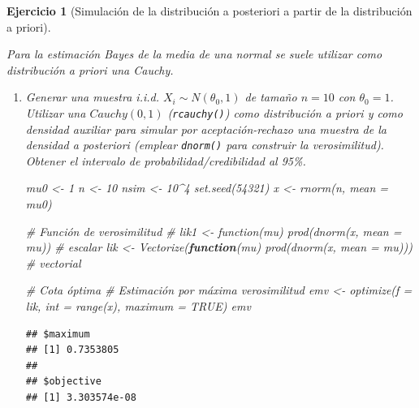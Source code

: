 \documentclass[
]{book}
\newenvironment{Shaded}{\begin{snugshade}}{\end{snugshade}}
\newcommand{\AttributeTok}[1]{\textcolor[rgb]{0.77,0.63,0.00}{#1}}
\newcommand{\CommentTok}[1]{\textcolor[rgb]{0.56,0.35,0.01}{\textit{#1}}}
\newcommand{\ConstantTok}[1]{\textcolor[rgb]{0.00,0.00,0.00}{#1}}
\newcommand{\ControlFlowTok}[1]{\textcolor[rgb]{0.13,0.29,0.53}{\textbf{#1}}}
\newcommand{\DecValTok}[1]{\textcolor[rgb]{0.00,0.00,0.81}{#1}}
\newcommand{\FunctionTok}[1]{\textcolor[rgb]{0.00,0.00,0.00}{#1}}
\newcommand{\NormalTok}[1]{#1}
\newcommand{\OtherTok}[1]{\textcolor[rgb]{0.56,0.35,0.01}{#1}}
\newcommand{\SpecialCharTok}[1]{\textcolor[rgb]{0.00,0.00,0.00}{#1}}
\theoremstyle{break}
\newtheorem{exercise}{Ejercicio}[chapter]
\theoremstyle{nonumberplain}
\begin{document}
\begin{exercise}[Simulación de la distribución a posteriori a partir de la distribución a priori]
\protect\hypertarget{exr:post-pri-ar}{}\label{exr:post-pri-ar}

Para la estimación Bayes de la media de una normal se suele utilizar
como distribución a priori una Cauchy.

\begin{enumerate}
\def\labelenumi{\alph{enumi})}
\item
  Generar una muestra i.i.d. \(X_{i}\sim N(\theta_{0},1)\) de tamaño
  \(n=10\) con \(\theta_{0}=1\). Utilizar una \(Cauchy(0,1)\)
  (\texttt{rcauchy()}) como distribución a priori y como densidad auxiliar
  para simular por aceptación-rechazo una muestra de la densidad a
  posteriori (emplear \texttt{dnorm()} para construir la verosimilitud).
  Obtener el intervalo de probabilidad/credibilidad al 95\%.

\begin{Shaded}
\begin{Highlighting}[]
\NormalTok{mu0 }\OtherTok{\textless{}{-}} \DecValTok{1}
\NormalTok{n }\OtherTok{\textless{}{-}} \DecValTok{10}
\NormalTok{nsim }\OtherTok{\textless{}{-}} \DecValTok{10}\SpecialCharTok{\^{}}\DecValTok{4}
\FunctionTok{set.seed}\NormalTok{(}\DecValTok{54321}\NormalTok{)}
\NormalTok{x }\OtherTok{\textless{}{-}} \FunctionTok{rnorm}\NormalTok{(n, }\AttributeTok{mean =}\NormalTok{ mu0)}

\CommentTok{\# Función de verosimilitud}
\CommentTok{\# lik1 \textless{}{-} function(mu) prod(dnorm(x, mean = mu)) \# escalar}
\NormalTok{lik }\OtherTok{\textless{}{-}} \FunctionTok{Vectorize}\NormalTok{(}\ControlFlowTok{function}\NormalTok{(mu) }\FunctionTok{prod}\NormalTok{(}\FunctionTok{dnorm}\NormalTok{(x, }\AttributeTok{mean =}\NormalTok{ mu))) }\CommentTok{\# vectorial}

\CommentTok{\# Cota óptima}
\CommentTok{\# Estimación por máxima verosimilitud}
\NormalTok{emv }\OtherTok{\textless{}{-}} \FunctionTok{optimize}\NormalTok{(}\AttributeTok{f =}\NormalTok{ lik, }\AttributeTok{int =} \FunctionTok{range}\NormalTok{(x), }\AttributeTok{maximum =} \ConstantTok{TRUE}\NormalTok{)}
\NormalTok{emv}
\end{Highlighting}
\end{Shaded}

\begin{verbatim}
## $maximum
## [1] 0.7353805
## 
## $objective
## [1] 3.303574e-08
\end{verbatim}


\end{enumerate}
\end{exercise}
\end{document}
